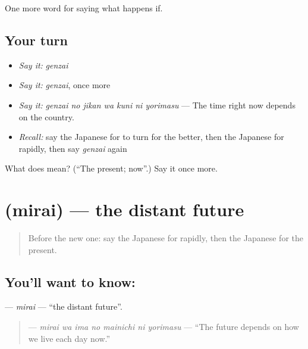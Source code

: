 \begin{grammarlens}[title={What you've built}]
One more word for saying what happens if.
\end{grammarlens}

\subsection*{Your turn}
\begin{itemize}
\raggedright
  \item \emph{Say it:} \emph{genzai}
  \item \emph{Say it:} \emph{genzai}, once more
  \item \emph{Say it:} \emph{genzai no jikan wa kuni ni yorimasu} — The time right now depends on the country.
  \item \emph{Recall:} say the Japanese for to turn for the better, then the Japanese for rapidly, then say \emph{genzai} again
\end{itemize}

\begin{tcolorbox}[breakable,colback=teal!4,colframe=teal!35!black,title={Before you move on}]
What does  mean? (\textquotedblleft{}The present; now\textquotedblright{}.) Say it once more.
\end{tcolorbox}
\section[\texorpdfstring{\ja{みらい} (mirai)}{みらい (mirai)}]{ (mirai) — the distant future}

\label{lesson:JA-C527-mirai}



\begin{quote}
Before the new one: say the Japanese for rapidly, then the Japanese for the present.
\end{quote}

\subsection*{You'll want to know: }
\textbf{} — \emph{mirai} — \textquotedblleft{}the distant future\textquotedblright{}.

\begin{quote}
\textbf{   } — \emph{mirai wa ima no mainichi ni yorimasu} — \textquotedblleft{}The future depends on how we live each day now.\textquotedblright{}
\end{quote}

